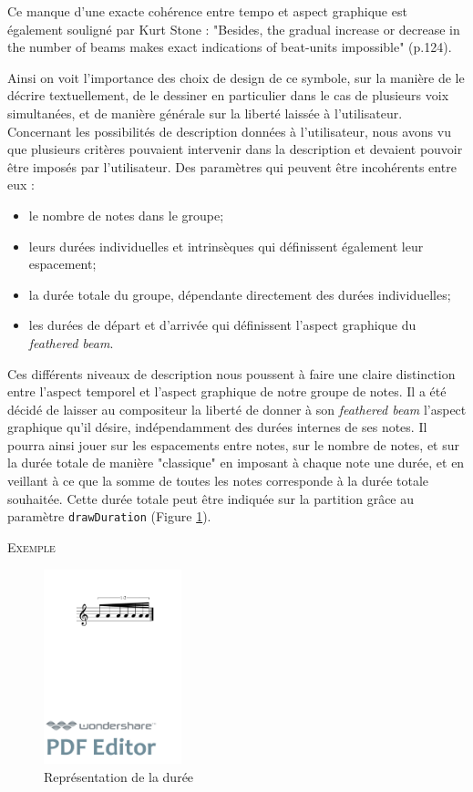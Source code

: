 \documentclass{article}
\newenvironment{gmncode}	{\vspace{-2mm}\small\verbatim}{\endverbatim\vspace{-2mm}}
\newcommand{\code}[1]		{{\small \texttt{#1}}}
\newcommand{\exemple}		{\vspace{2mm}\hspace*{-6mm}\textsc{Exemple}}
\begin{document}
Ce manque d'une exacte cohérence entre tempo et aspect graphique est également souligné par Kurt Stone \cite{stone1980music} : "Besides, the gradual increase or decrease in the number of beams makes exact indications of beat-units impossible" (p.124).

Ainsi on voit l'importance des choix de design de ce symbole, sur la manière de le décrire textuellement, de le dessiner en particulier dans le cas de plusieurs voix simultanées, et de manière générale sur la liberté laissée à l'utilisateur.
\\

Concernant les possibilités de description données à l'utilisateur, nous avons vu que plusieurs critères pouvaient intervenir dans la description et devaient pouvoir être imposés par l'utilisateur. Des paramètres qui peuvent être incohérents entre eux :
\begin{itemize}
\item le nombre de notes dans le groupe;
\item leurs durées individuelles et intrinsèques qui définissent également leur espacement;
\item la durée totale du groupe, dépendante directement des durées individuelles;
\item les durées de départ et d'arrivée qui définissent l'aspect graphique du \emph{feathered beam}.
\end{itemize}
\bigskip

Ces différents niveaux de description nous poussent à faire une claire distinction entre l'aspect temporel et l'aspect graphique de notre groupe de notes.  Il a été décidé de laisser au compositeur la liberté de donner à son \emph{feathered beam} l'aspect graphique qu'il désire, indépendamment des durées internes de ses notes. Il pourra ainsi jouer sur les espacements entre notes, sur le nombre de notes, et sur la durée totale de manière "classique" en imposant à chaque note une durée, et en veillant à ce que la somme de toutes les notes corresponde à la durée totale souhaitée. Cette durée totale peut être indiquée sur la partition grâce au paramètre \code{drawDuration} (Figure \ref{fig:fbeamduree}).

\exemple
\begin{figure}[h]
\centering
\begin{gmncode}
[ 
  \fBeam<drawDuration="true"> (
    a/8 a a/16 a a a/32 a
  )
]
\end{gmncode}
\includegraphics[width=40mm]{img/fbeamduree.pdf}
\caption{Représentation de la durée}
\label{fig:fbeamduree}
\end{figure}
\end{document}
